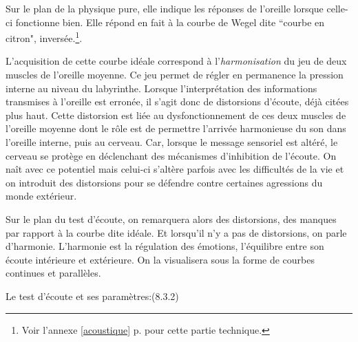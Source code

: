       
Sur le plan de la physique pure, elle indique les réponses de l'oreille
lorsque celle-ci fonctionne bien. Elle répond en fait à la courbe
de Wegel dite ``courbe en citron", inversée.\footnote{%
		Voir l'annexe \ref{acoustique} p. \pageref{acoustique}
		 pour cette partie technique.}.

               

L'acquisition de cette courbe idéale correspond à l'\textsl{harmonisation}
du jeu de deux muscles de l'oreille moyenne. Ce jeu
permet de régler en permanence la pression interne au niveau du
labyrinthe.
Lorsque l'interprétation des informations transmises à l'oreille est
erronée, il s'agit donc  de
distorsions d'écoute, déjà citées plus haut. Cette distorsion est liée au dysfonctionnement
de ces deux muscles de l'oreille moyenne dont le rôle est de permettre l'arrivée
harmonieuse du son dans l'oreille interne, puis au cerveau. Car, lorsque
le message sensoriel est altéré, le cerveau se protège en déclenchant
des mécanismes d'inhibition de l'écoute. On naît
avec ce potentiel mais celui-ci s'altère parfois avec les difficultés
de la vie et on introduit des distorsions
pour se défendre contre certaines agressions du monde extérieur. 

Sur le plan du test d'écoute, on remarquera
alors des distorsions, des manques par rapport à la courbe dite 
idéale.
Et lorsqu'il n'y a pas de distorsions, on parle d'harmonie. L'harmonie
est la régulation des émotions, l'équilibre entre son écoute
intérieure et extérieure. On la visualisera sous la forme de
courbes continues et parallèles.


Le test d'écoute et ses paramètres:(8.3.2)




  




 




  

